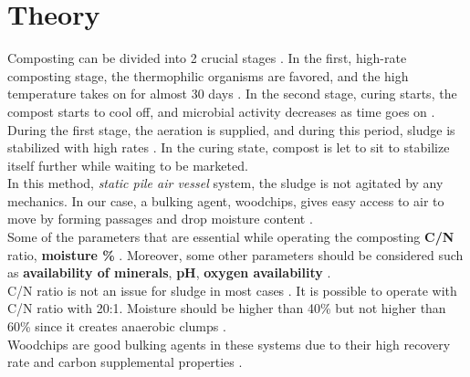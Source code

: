 \documentclass[a4paper]{article}
\begin{document}
\section*{Theory}
Composting can be divided into 2 crucial stages \autocite{Eliot1997, metcalf2014}. In the first, high-rate composting stage, the thermophilic organisms are favored, and the high temperature takes on for almost 30 days \autocite{vesilind1988}. In the second stage, curing starts, the compost starts to cool off, and microbial activity decreases as time goes on \autocite{vesilind1988, metcalf2014}.\\
During the first stage, the aeration is supplied, and during this period, sludge is stabilized with high rates \autocite{sanin2011}. In the curing state, compost is let to sit to stabilize itself further while waiting to be marketed.\\
In this method, \textsl{static pile air vessel} system, the sludge is not agitated by any mechanics. In our case, a bulking agent, woodchips, gives easy access to air to move by forming passages and drop moisture content \autocite{sanin2011, vesilind1988}.\\
Some of the parameters that are essential while operating the composting \textbf{C/N} ratio, \textbf{moisture \%} \autocite{sanin2011, metcalf2014, vesilind1988}. Moreover, some other parameters should be considered such as \textbf{availability of minerals}, \textbf{pH}, \textbf{oxygen availability} \autocite{sanin2011}.\\
C/N ratio is not an issue for sludge in most cases \autocite{vesilind1988}. It is possible to operate with C/N ratio with 20:1. Moisture should be higher than 40\% but not higher than 60\% since it creates anaerobic clumps \autocite{vesilind1988}.\\
Woodchips are good bulking agents in these systems due to their high recovery rate and carbon supplemental properties \autocite{metcalf2014}.
\end{document}
